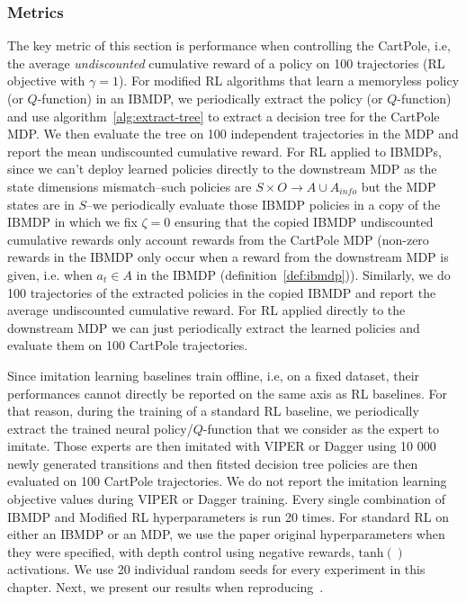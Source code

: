 \subsubsection{Metrics}
The key metric of this section is performance when controlling the CartPole, i.e, the average \textit{undiscounted} cumulative reward of a policy on 100 trajectories (RL objective with $\gamma=1$).
For modified RL algorithms that learn a memoryless policy (or $Q$-function) in an IBMDP, we periodically extract the policy (or $Q$-function) and use algorithm~\ref{alg:extract-tree} to extract a decision tree for the CartPole MDP. 
We then evaluate the tree on 100 independent trajectories in the MDP and report the mean undiscounted cumulative reward.
For RL applied to IBMDPs, since we can't deploy learned policies directly to the downstream MDP as the state dimensions mismatch--such policies are $S\times O\rightarrow A \cup A_{info}$ but the MDP states are in $S$--we periodically evaluate those IBMDP policies in a copy of the IBMDP in which we fix $\zeta=0$ ensuring that the copied IBMDP undiscounted cumulative rewards only account rewards from the CartPole MDP (non-zero rewards in the IBMDP only occur when a reward from the downstream MDP is given, i.e. when $a_t\in A$ in the IBMDP (definition~\ref{def:ibmdp})).
Similarly, we do 100 trajectories of the extracted policies in the copied IBMDP and report the average undiscounted cumulative reward.
For RL applied directly to the downstream MDP we can just periodically extract the learned policies and evaluate them on 100 CartPole trajectories.

Since imitation learning baselines train offline, i.e, on a fixed dataset, their performances cannot directly be reported on the same axis as RL baselines.
For that reason, during the training of a standard RL baseline, we periodically extract the trained neural policy/$Q$-function that we consider as the expert to imitate.
Those experts are then imitated with VIPER or Dagger using 10 000 newly generated transitions and then fitsted decision tree policies are then evaluated on 100 CartPole trajectories.
We do not report the imitation learning objective values during VIPER or Dagger training.
Every single combination of IBMDP and Modified RL hyperparameters is run 20 times.
For standard RL on either an IBMDP or an MDP, we use the paper original hyperparameters when they were specified, with depth control using negative rewards, $\operatorname{tanh()}$ activations.
We use 20 individual random seeds for every experiment in this chapter.
Next, we present our results when reproducing~\citep{topin2021iterative}.

